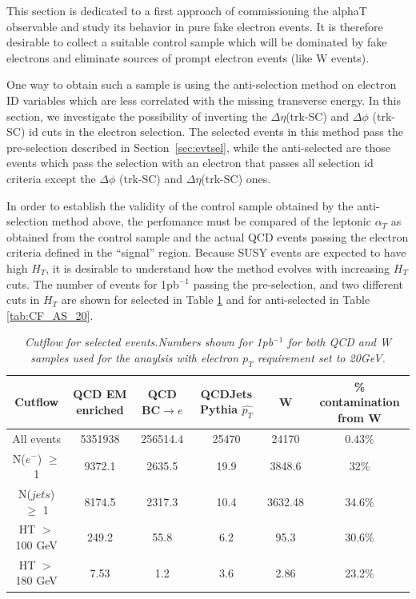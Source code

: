 This section is dedicated to a first approach of commissioning the alphaT observable and study its behavior in pure fake electron events. It is therefore desirable to collect a suitable control sample which will be dominated by fake electrons and eliminate sources of prompt electron events (like W events).

One way to obtain such a sample is using the anti-selection method on electron ID variables which are less correlated with the missing transverse energy. In this section, we investigate the possibility of inverting the $\Delta \eta$(trk-SC) and $\Delta \phi$ (trk-SC) id cuts in the electron selection. The selected events in this method pass the pre-selection described in Section~\ref{sec:evtsel}, while the anti-selected are those events which pass the selection with an electron that passes all selection id criteria except the $\Delta \phi$ (trk-SC) and $\Delta \eta$(trk-SC) ones. 

In order to establish the validity of the control sample obtained by the anti-selection method above, the perfomance must be compared of the leptonic $\alpha_T$ as obtained from the control sample and the actual QCD events passing the electron criteria defined in the ``signal'' region. Because SUSY events are expected to have high $H_{T}$, it is desirable to understand how the method evolves with increasing $H_{T}$ cuts. The number of events for 1pb$^{-1}$ passing the pre-selection, and two different cuts in $H_{T}$ are shown for selected in Table \ref{tab:CF_S_20} and for anti-selected in Table \ref{tab:CF_AS_20}. 

\vspace{3mm}
\begin{table}[h!]
\begin{center}
\begin{tabular}{|c||c|c|c|c|c|}
\hline
Cutflow & QCD EM enriched & QCD BC$\rightarrow e$ & QCDJets Pythia $\hat{p_{T}}$ & W & \% contamination from W\\
\hline
\hline
All events & 5351938 & 256514.4 & 25470 & 24170 & 0.43\%\\
N($e^{-}$) $\geq$ 1 & 9372.1 & 2635.5 & 19.9 & 3848.6 & 32\%\\
N($jets$) $\geq$ 1 & 8174.5 & 2317.3 & 10.4 & 3632.48 & 34.6\%\\
HT $>$ 100 GeV & 249.2 & 55.8 & 6.2 & 95.3 & 30.6\%\\
HT $>$ 180 GeV & 7.53 & 1.2 & 3.6 & 2.86 & 23.2\%\\
\hline
\end{tabular}
\end{center}
\caption{\textit{Cutflow for selected events.Numbers shown for 1pb$^{-1}$ for both QCD and W samples used for the anaylsis with electron $p_{T}$ requirement set to 20GeV.}}
\label{tab:CF_S_20}
\end{table}

